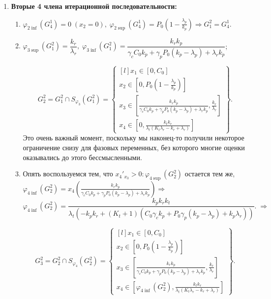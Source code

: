 \documentclass[12pt,a4paper]{article}
\newcommand{\xin}[3]{x_{#1} \in \left[ #2, #3 \right]}
\newcommand{\set}[1]{
    \left\{ \begin{matrix*}[l] #1 \end{matrix*}     
    \right\}   
    }
\begin{document}
\begin{enumerate}
    \item \textbf{Вторые 4 члена итерационной последовательности:}

    \begin{enumerate}
                
        \item  $\varphi_{2 \inf}(G_4^1) = 0\; (x_2 = 0),\; \varphi_{2 \sup}(G_4^1) = P_0\left( 1 - \frac{\lambda_p}{k_p} \right) \Rightarrow G_1^2 = G_4^1 $.

        \item $\varphi_{3 \sup}(G_1^2) =  \dfrac{k_r}{\lambda_r}, \; \varphi_{3 \inf}(G_1^2) = 
            \dfrac{k_r k_p}{\gamma_c C_0 k_p + \gamma_p P_0 (k_p - \lambda_p) + \lambda_r k_p}$;

            $$G_2^2 = G_1^2 \cap S_{\varphi_3}(G_1^2) = \set{
                \xin{1}{0}{ C_0 } \\
                \xin{2}{0}{P_0\left( 1 - \frac{\lambda_p}{k_p} \right)} \\
                \xin{3}{\frac{k_r k_p}{\gamma_c C_0 k_p + \gamma_p P_0 (k_p - \lambda_p) + \lambda_r k_p}}{\frac{k_r}{\lambda_r}} \\
                \xin{4}{0}{\frac{k_t k_r}{\lambda_t(K_t \lambda_r - k_r + \lambda_r)}}
            }.
            $$
        Это очень важный момент, поскольку мы наконец-то получили некоторое ограничение снизу для фазовых переменных, без которого многие оценки оказывались до этого бессмысленными.
        
        \item Опять воспользуемся тем, что ${x_4}'_{x_3} > 0: \varphi_{4 \sup}(G_2^2)$ остается тем же, $\varphi_{4 \inf}(G_2^2) = 
        x_4\left( \frac{k_r k_p}{\gamma_c C_0 k_p + \gamma_p P_0 (k_p - \lambda_p) + \lambda_r k_p} \right) \Rightarrow $
        $$ \varphi_{4 \inf}(G_2^2) = \dfrac{k_{p} k_{r} k_{t}}{\lambda_{t} \left(- k_{p} k_{r} + \left(K_{t} + 1\right) \left(C_{0} \gamma_{c} k_{p} + P_{0} \gamma_{p} \left(k_{p} - \lambda_{p}\right) + k_{p} \lambda_{r}\right)\right)}. \; \Rightarrow
        $$

        $$G_3^2 = G_2^2 \cap S_{\varphi_4}(G_2^2) = \set{
            \xin{1}{0}{ C_0 } \\
            \xin{2}{0}{P_0\left( 1 - \frac{\lambda_p}{k_p} \right)} \\
            \xin{3}{\frac{k_r k_p}{\gamma_c C_0 k_p + \gamma_p P_0 (k_p - \lambda_p) + \lambda_r k_p}}{\frac{k_r}{\lambda_r}} \\
            \xin{4}{\varphi_{4 \inf}(G_2^2)}{\frac{k_t k_r}{\lambda_t(K_t \lambda_r - k_r + \lambda_r)}}
            }.
        $$


\end{enumerate}
\end{enumerate}
\end{document}
